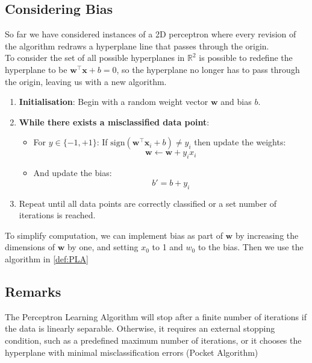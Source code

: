 \subsection{Considering Bias}
So far we have considered instances of a 2D perceptron where every revision of the algorithm redraws a hyperplane line that passes through the origin. \\

\noindent
To consider the set of all possible hyperplanes in $\mathbb{R}^2$ is possible to redefine the hyperplane to be $\textbf{w}^\top \mathbf{x} + b = 0 $, so the hyperplane no longer has to pass through the origin, leaving us with a new algorithm.


\begin{enumerate}
    \item \textbf{Initialisation}: Begin with a random weight vector \( \mathbf{w} \) and bias \( b \).
    \item \textbf{While there exists a misclassified data point}: 
    \begin{itemize}
        \item For \( y \in \{-1, +1\} \): If \( \text{sign}(\mathbf{w}^\top \textbf{x} _i + b) \neq y_i \) then update the weights:
        \[
        \mathbf{w} \leftarrow \mathbf{w} + y_i x_i
        \]

        \item And update the bias:
        \[ b' = b + y_i \]

    \end{itemize}
    \item Repeat until all data points are correctly classified or a set number of iterations is reached.
\end{enumerate}

\noindent
To simplify computation, we can implement bias as part of $\textbf{w}$ by increasing the dimensions of $\textbf{w}$ by one, and setting $x_0$ to 1 and $w_0$ to the bias. Then we use the algorithm in \ref{def:PLA}




\subsection{Remarks}
The Perceptron Learning Algorithm will stop after a finite number of iterations if the data is linearly separable. Otherwise, it requires an external stopping condition, such as a predefined maximum number of iterations, or it chooses the hyperplane with minimal misclassification errors (Pocket Algorithm)

